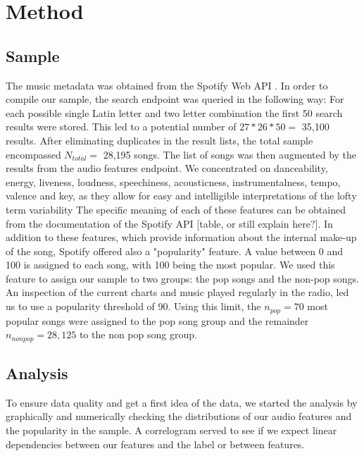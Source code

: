 \documentclass{article}
\begin{document}
\section{Method}

\subsection{Sample}
The music metadata was obtained from the Spotify Web API \citep{spotifyAPIdocu}. In order to compile our sample, the search endpoint was queried in the following way: For each possible single Latin letter and two letter combination the first 50 search results were stored. This led to a potential number of \(27 * 26 * 50 =\) 35,100 results. After eliminating duplicates in the result lists, the total sample encompassed \(N_{total} =\) 28,195 songs. The list of songs was then augmented by the results from the audio features endpoint. We concentrated on danceability, energy, liveness, loudness, speechiness, acousticness, instrumentalness, tempo, valence and key, as they allow for easy and intelligible interpretations of the lofty term variability %
The specific meaning of each of these features can be obtained from the documentation of the Spotify API \citep{spotifyAPIdocu}[table, or still explain here?]. In addition to these features, which provide information about the internal make-up of the song, Spotify offered also a "popularity" feature. A value between 0 and 100 is assigned to each song, with 100 being the most popular. We used this feature to assign our sample to two groups: the pop songs and the non-pop songs. An inspection of the current charts and music played regularly in the radio, led us to use a popularity threshold of 90. Using this limit, the \(n_{pop} = 70\) most popular songs were assigned to the pop song group and the remainder \(n_{non pop} = 28,125\) to the non pop song group.

\subsection{Analysis}
To ensure data quality and get a first idea of the data, we started the analysis by graphically and numerically checking the distributions of our audio features and the popularity in the sample. A correlogram served to see if we expect linear dependencies between our features and the label or between features.
\end{document}
